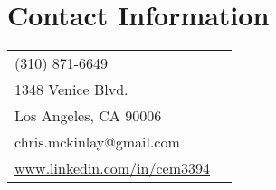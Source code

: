 \section{\sc Contact Information}
\vspace{.05in}
\begin{tabular}{@{}p{2in}p{4in}}
(310) 871-6649 \\
1348 Venice Blvd. \\
Los Angeles, CA 90006 \\
chris.mckinlay@gmail.com \\
\href{https://www.linkedin.com/in/cem3394}{www.linkedin.com/in/cem3394}

\\
\end{tabular}


